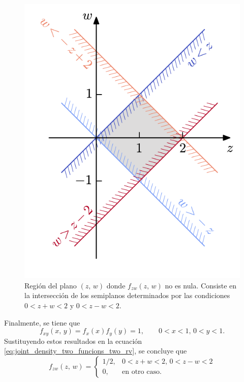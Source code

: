 \documentclass[a4paper]{report}
\begin{document}
\begin{figure}[!htb]
  \begin{minipage}[c]{0.4\textwidth}
    \includegraphics[width=\textwidth]{figuras/joint_distribution_sum_sub_v3.pdf}
  \end{minipage}\hfill
  \begin{minipage}[c]{0.57\textwidth}
    \caption{
       Región del plano \((z,\,w)\) donde \(f_{zw}(z,\,w)\) no es nula. Consiste en la intersección de los semiplanos determinados por las condiciones \(0<z+w<2\) y \(0<z-w<2\).
    } \label{fig:joint_distribution_sum_sub_v3}
  \end{minipage}
\end{figure}
Finalmente, se tiene que
\[
 f_{xy}(x,\,y)=f_x(x)f_y(y)=1,\qquad 0<x<1,\, 0<y<1.
\]
Sustituyendo estos resultados en la ecuación \ref{eq:joint_density_two_funcions_two_rv}, se concluye que
\[
 f_{zw}(z,\,w)=\left\{\begin{array}{ll}
  1/2, &  0<z+w<2,\,0<z-w<2\\
  0, & \textrm{en otro caso.}
 \end{array} \right.
\]
\end{document}
